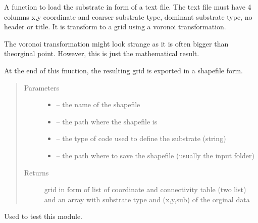 \documentclass[letterpaper,10pt,english]{sphinxmanual}
\begin{document}
\begin{fulllineitems}
\label{\detokenize{index:src.substrate.load_sub_txt}}
A function to load the substrate in form of a text file. The text file must have 4 columns x,y coordinate and
coarser substrate type, dominant substrate type, no header or title. It is transform to a grid using a voronoi
transformation.

The voronoi transformation might look strange as it is often bigger than theorginal point. However, this is
just the mathematical result.

At the end of this fnuction, the resulting grid is exported in a shapefile form.
\begin{quote}\begin{description}
\item[{Parameters}] \leavevmode\begin{itemize}
\item {} 
 -- the name of the shapefile

\item {} 
 -- the path where the shapefile is

\item {} 
 -- the type of code used to define the substrate (string)

\item {} 
 -- the path where to save the shapefile (usually the input folder)

\end{itemize}

\item[{Returns}] \leavevmode
grid in form of list of coordinate and connectivity table (two list)
and an array with substrate type and (x,y,sub) of the orginal data

\end{description}\end{quote}

\end{fulllineitems}


\begin{fulllineitems}
\label{\detokenize{index:src.substrate.main}}
Used to test this module.

\end{fulllineitems}
\end{document}
